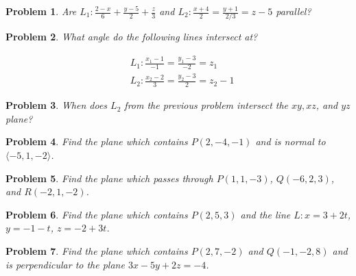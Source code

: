 \documentclass[11pt]{article}
\newtheorem{problem}{Problem}
\begin{document}
\vspace{7cm}


\begin{problem}
    Are $L_1: \frac{2-x}{6}+\frac{y-5}{2}+\frac{z}{3}$ and $L_2: \frac{x+4}{2}=\frac{y+1}{2/3}=z-5$ parallel?
\end{problem}

\vspace{2cm}

\begin{problem}
    What angle do the following lines intersect at?

    \begin{align*}
        &L_1 : \frac{x_1-1}{-1}=\frac{y_1-3}{-2}=z_1 \\
        &L_2 : \frac{x_2-2}{3} = \frac{y_2-3}{2}=z_2-1
    \end{align*}
\end{problem}

\vspace{5cm}


\begin{problem}
    When does $L_2$ from the previous problem intersect the $xy,xz$, and $yz$ plane?
\end{problem}

\vspace{3cm}

\begin{problem}
    Find the plane which contains $P(2,-4,-1)$ and is normal to $\langle -5,1,-2 \rangle$.
\end{problem}

\vspace{5cm}

\begin{problem}
    Find the plane which passes through $P(1,1,-3)$, $Q(-6,2,3)$, and $R(-2,1,-2)$.
\end{problem}

\vspace{6cm}

\begin{problem}
    Find the plane which contains $P(2,5,3)$ and the line $L: x = 3+2t$, $y = -1-t$, $z = -2+3t$.
\end{problem}

\vspace{6cm}

\begin{problem}
    Find the plane which contains $P(2,7,-2)$ and $Q(-1,-2,8)$ and is perpendicular to the plane $3x-5y+2z = -4$.
\end{problem}
\end{document}
